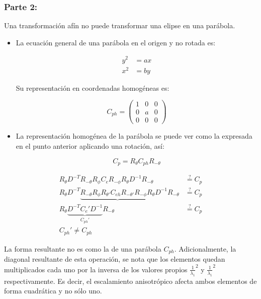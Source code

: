 \subsubsection*{Parte 2:} Una transformación afín no puede transformar una elipse en una parábola.

\begin{itemize}
\item La ecuación general de una parábola en el origen y no rotada es:

\begin{equation*}
\begin{aligned}
y^2 &= a x  \\
x^2 &= b y
\end{aligned}
\end{equation*} 

Su representación en coordenadas
homogéneas es:

\begin{equation*}
C_{ph}=
\begin{pmatrix}
1 & 0 & 0 \\ 
0 & a & 0 \\
0 & 0 & 0
\end{pmatrix} 
\end{equation*} 

\item La representación homogénea de la parábola se puede ver como la 
expresada en el punto anterior aplicando una rotación, así:

\begin{equation}
C_p= R_\theta C_{ph} R_{-\theta}
\label{eq:p83}
\end{equation} 

\end{itemize} 

\begin{equation*}
\begin{aligned}
R_\theta D^{-T} R_{-\theta} R_\phi 
C_e 
R_{-\phi} R_{\theta} D^{-1} R_{-\theta} &\stackrel{?}{=} C_p \\
R_\theta D^{-T} 
\underbrace{R_{-\theta} R_\phi R_{\theta'}
C_{eh} 
R_{-\theta'} R_{-\phi} R_{\theta} }
D^{-1} R_{-\theta} &\stackrel{?}{=} C_p \\
R_\theta 
\underbrace{D^{-T}  C_e' D^{-1} }_\text{$C_{ph}'$}
R_{-\theta} &\stackrel{?}{=} C_p \\
C_{ph}' \neq C_{ph}
\end{aligned}
\end{equation*} 

La forma resultante no es como la de una parábola $C_{ph}$.
Adicionalmente, la diagonal resultante de esta operación, se nota que los elementos
quedan multiplicados cada uno por la inversa de los valores propios $\frac{1}{\lambda_1}^2$ y 
$\frac{1}{\lambda_1}^2$ respectivamente. Es decir, el escalamiento anisotrópico afecta ambos
elementos de forma cuadrática y no sólo uno. 
